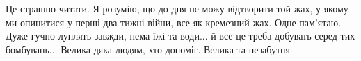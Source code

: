  
 
 
 
 

\qqSecCmt


Це страшно читати. Я розумію, що до дня не можу відтворити той жах, у якому ми
опинитися у перші два тижні війни, все як кремезний жах. Одне пам'ятаю. Дуже
гучно луплять завжди, нема їжі та води... й все це треба добувать серед тих
бомбувань... Велика дяка людям, хто допоміг. Велика та незабутня


